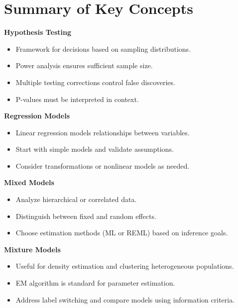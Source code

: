 \documentclass[11pt,a4paper]{article}
\begin{document}
\section{Summary of Key Concepts}

\begin{mdframed}[linecolor=maincolor,backgroundcolor=gray!5!white]
\textbf{Hypothesis Testing}
\begin{itemize}
  \item Framework for decisions based on sampling distributions.
  \item Power analysis ensures sufficient sample size.
  \item Multiple testing corrections control false discoveries.
  \item P-values must be interpreted in context.
\end{itemize}
\end{mdframed}

\begin{mdframed}[linecolor=maincolor,backgroundcolor=gray!5!white]
\textbf{Regression Models}
\begin{itemize}
  \item Linear regression models relationships between variables.
  \item Start with simple models and validate assumptions.
  \item Consider transformations or nonlinear models as needed.
\end{itemize}
\end{mdframed}

\begin{mdframed}[linecolor=maincolor,backgroundcolor=gray!5!white]
\textbf{Mixed Models}
\begin{itemize}
  \item Analyze hierarchical or correlated data.
  \item Distinguish between fixed and random effects.
  \item Choose estimation methods (ML or REML) based on inference goals.
\end{itemize}
\end{mdframed}

\begin{mdframed}[linecolor=maincolor,backgroundcolor=gray!5!white]
\textbf{Mixture Models}
\begin{itemize}
  \item Useful for density estimation and clustering heterogeneous populations.
  \item EM algorithm is standard for parameter estimation.
  \item Address label switching and compare models using information criteria.
\end{itemize}
\end{mdframed}
\end{document}
